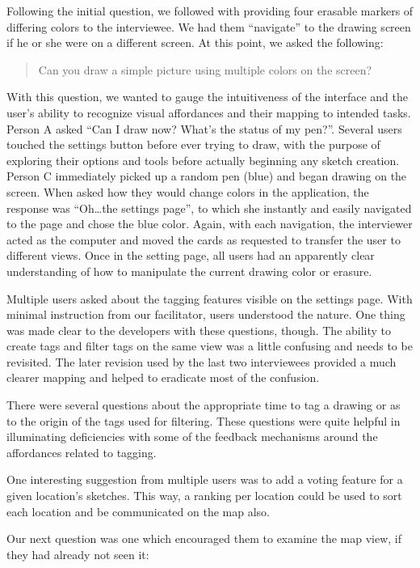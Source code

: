 \documentclass{chi2009}
\begin{document}
Following the initial question, we followed with providing four erasable
markers of differing colors to the interviewee.  We had them ``navigate'' to
the drawing screen if he or she were on a different screen.  At this point, we
asked the following:

\begin{quote}
Can you draw a simple picture using multiple colors on the screen?
\end{quote}

With this question, we wanted to gauge the intuitiveness of the interface and
the user's ability to recognize visual affordances and their mapping to
intended tasks.  Person A asked ``Can I draw now?  What's the status of my
pen?''.  Several users touched the settings button before ever trying to draw,
with the purpose of exploring their options and tools before actually beginning
any sketch creation.  Person C immediately picked up a random pen (blue) and
began drawing on the screen.  When asked how they would change colors in the
application, the response was ``Oh\ldots  the settings page'', to which she
instantly and easily navigated to the page and chose the blue color.  Again,
with each navigation, the interviewer acted as the computer and moved the cards
as requested to transfer the user to different views.  Once in the setting
page, all users had an apparently clear understanding of how to manipulate the
current drawing color or erasure.

Multiple users asked about the tagging features visible on the settings page.
With minimal instruction from our facilitator, users understood the nature.
One thing was made clear to the developers with these questions, though.  The
ability to create tags and filter tags on the same view was a little confusing
and needs to be revisited.  The later revision used by the last two
interviewees provided a much clearer mapping and helped to eradicate most of
the confusion.

There were several questions about the appropriate time to tag a drawing or as
to the origin of the tags used for filtering.  These questions were quite
helpful in illuminating deficiencies with some of the feedback mechanisms
around the affordances related to tagging.

One interesting suggestion from multiple users was to add a voting feature for
a given location's sketches.  This way, a ranking per location could be used to
sort each location and be communicated on the map also.

Our next question was one which encouraged them to examine the map view, if
they had already not seen it:
\end{document}
